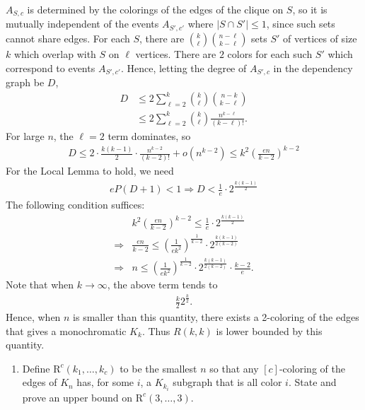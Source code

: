 \documentclass[11pt,letterpaper]{article}
\theoremstyle{definition}
\begin{document}
$A_{S,c}$ is determined by the colorings of the edges of the clique on $S$, so it is mutually independent of the events $A_{S',c'}$ where $|S\cap S'|\leq 1$, since such sets cannot share edges.
For each $S$, there are $\binom{k}{\ell}\binom{n-\ell}{k-\ell}$ sets $S'$ of vertices of size $k$ which overlap with $S$ on $\ell$ vertices.
There are $2$ colors for each such $S'$ which correspond to events $A_{S',c'}$.
Hence, letting the degree of $A_{S',c}$ in the dependency graph be $D$,
\begin{align*}
    D &\leq 2 \sum_{\ell=2}^k \binom{k}{\ell}\binom{n-k}{k-\ell} \\
    &\leq 2\sum_{\ell=2}^k \binom{k}{\ell}\frac{n^{k-\ell}}{(k-\ell)!}.
\end{align*}
For large $n$, the $\ell=2$ term dominates, so 
\begin{align*}
    D \leq 2\cdot \frac{k(k-1)}{2}\cdot \frac{n^{k-2}}{(k-2)!} + o(n^{k-2}) \leq k^2\left(\frac{en}{k-2}\right)^{k-2}
\end{align*}
For the Local Lemma to hold, we need
\begin{align*}
    eP(D+1)<1 \Rightarrow D< \frac{1}{e}\cdot 2^{\frac{k(k-1)}{2}}
\end{align*}
The following condition suffices:
\begin{align*}
    &k^2\left(\frac{en}{k-2}\right)^{k-2} \leq \frac{1}{e}\cdot 2^{\frac{k(k-1)}{2}} \\
    \Rightarrow & \frac{en}{k-2}\leq \left(\frac{1}{ek^2}\right)^{\frac{1}{k-2}}\cdot 2^{\frac{k(k-1)}{2(k-2)}} \\
    \Rightarrow &n\leq \left(\frac{1}{ek^2}\right)^{\frac{1}{k-2}}\cdot 2^{\frac{k(k-1)}{2(k-2)}}\cdot \frac{k-2}{e}.
\end{align*}
Note that when $k\to \infty$, the above term tends to 
\begin{align*}
    \frac{k}{2}2^\frac{k}{2}.
\end{align*}
Hence, when $n$ is smaller than this quantity, there exists a 2-coloring of the edges that gives a monochromatic $K_k$. 
Thus $R(k,k)$ is lower bounded by this quantity.


\begin{enumerate}[resume=q]
\item Define $\mathrm{R}^c(k_1,\dots,k_c)$ to be the smallest $n$ so that any $[c]$-coloring of the edges of $K_n$ has, for some $i$, a $K_{k_i}$ subgraph that is all color $i$. State and prove an upper bound on $\mathrm{R}^c(3,\dots,3)$.
\end{enumerate}
\end{document}
